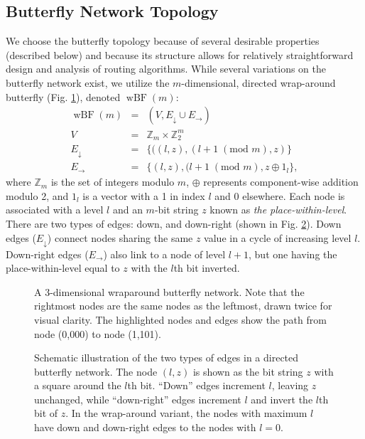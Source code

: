 \documentclass[10pt,letterpaper]{article}
\newcommand{\beq}{\begin{eqnarray}}
\newcommand{\eeq}{\end{eqnarray}}
\DeclareMathOperator{\wbf}{wBF}
\begin{document}
\subsection*{Butterfly Network Topology}

We choose the butterfly topology
\cite{kshemkalyani_distributed_2008}
because of several desirable properties (described below)
and because its structure allows for relatively straightforward
design and analysis of routing algorithms.
While several variations on the butterfly network exist,
we utilize the $m$-dimensional, directed wrap-around butterfly
(Fig. \ref{fig:bf-route}),
denoted $\wbf(m)$:
\beq
\wbf(m) &=& (V, E_\downarrow \cup E_\rightarrow) \\
V &=& \mathbb{Z}_{m} \times \mathbb{Z}_2^m \\
E_\downarrow
&=&
\{((l,z),(l+1 \; (\text{mod } m),z) \} \\
E_\rightarrow
&=&
\{(l,z),(l+1 \; (\text{mod } m),
z \oplus 1_l \},
\eeq
where $\mathbb{Z}_m$ is the set of integers modulo $m$,
$\oplus$ represents component-wise addition modulo 2,
and $1_l$ is a vector with a 1 in index $l$ and 0 elsewhere.
Each node is associated with a level $l$ and an $m$-bit string $z$
known as {\em the place-within-level}.
There are two types of edges: down, and down-right
(shown in Fig. \ref{fig:butterfly}).
Down edges ($E_\downarrow$) connect nodes sharing the same $z$ value
in a cycle of increasing level $l$.
Down-right edges ($E_\rightarrow$) also link to a node of level $l + 1$,
but one having the place-within-level equal to $z$ with the $l$th bit inverted.

\begin{figure}[!h]
\begin{center}
\end{center}
\caption{
A 3-dimensional wraparound butterfly network.
Note that the rightmost nodes are the same nodes as the leftmost,
drawn twice for visual clarity.
The highlighted nodes and edges show the path from node (0,000)
to node (1,101).
\label{fig:bf-route}
}
\end{figure}

\begin{figure}[!h]
\begin{center}
\end{center}
\caption{
Schematic illustration of the two types of edges in a directed butterfly
network.
The node $(l,z)$ is shown as the bit string $z$ with a square around the
$l$th bit.
``Down'' edges increment $l$, leaving $z$ unchanged,
while ``down-right'' edges increment $l$ and invert the $l$th bit of $z$.
In the wrap-around variant, the nodes with maximum $l$ have down and down-right
edges to the nodes with $l=0$.
\label{fig:butterfly}
}
\end{figure}
\end{document}
